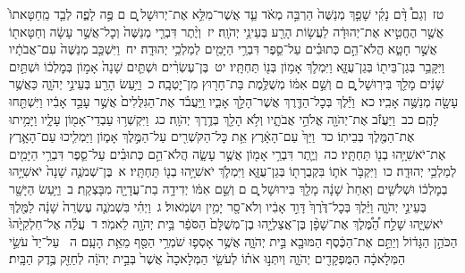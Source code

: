 \documentclass[18pt]{article}
\newcommand{\kri}[1]{\Afootnote{#1}}	%
\begin{document}
 {\loc טז~}וְגַם֩ דָּ֨ם נָקִ֜י שָׁפַ֤ךְ מְנַשֶּׁה֙ הַרְבֵּ֣ה מְאֹ֔ד עַ֛ד אֲשֶׁר־מִלֵּ֥א אֶת־יְרוּשָׁל ַ֖͏ְם ם פֶּ֣ה לָפֶ֑ה לְבַ֤ד מֵֽחַטָּאתוֹ֙ אֲשֶׁ֣ר הֶחֱטִ֣יא אֶת־יְהוּדָ֔ה לַעֲשׂ֥וֹת הָרַ֖ע בְּעֵינֵ֥י יְהֹוָֽה׃ \startlock
 {\loc יז~}וְיֶ֨תֶר דִּבְרֵ֤י מְנַשֶּׁה֙ וְכׇל־אֲשֶׁ֣ר עָשָׂ֔ה וְחַטָּאת֖וֹ אֲשֶׁ֣ר חָטָ֑א הֲלֹא־הֵ֣ם כְּתוּבִ֗ים עַל־סֵ֛פֶר דִּבְרֵ֥י הַיָּמִ֖ים לְמַלְכֵ֥י יְהוּדָֽה׃ \startlock
 {\loc יח~}וַיִּשְׁכַּ֤ב מְנַשֶּׁה֙ עִם־אֲבֹתָ֔יו וַיִּקָּבֵ֥ר בְּגַן־בֵּית֖וֹ בְּגַן־עֻזָּ֑א וַיִּמְלֹ֛ךְ אָמ֥וֹן בְּנ֖וֹ תַּחְתָּֽיו׃ \startlock
 {\loc יט~}בֶּן־עֶשְׂרִ֨ים וּשְׁתַּ֤יִם שָׁנָה֙ אָמ֣וֹן בְּמׇלְכ֔וֹ וּשְׁתַּ֣יִם שָׁנִ֔ים מָלַ֖ךְ בִּירֽוּשָׁל ָ֑͏ְם ם וְשֵׁ֣ם אִמּ֔וֹ מְשֻׁלֶּ֥מֶת בַּת־חָר֖וּץ מִן־יׇטְבָֽה׃ \startlock
 {\loc כ~}וַיַּ֥עַשׂ הָרַ֖ע בְּעֵינֵ֣י יְהֹוָ֑ה כַּאֲשֶׁ֥ר עָשָׂ֖ה מְנַשֶּׁ֥ה אָבִֽיו׃ \startlock
 {\loc כא~}וַיֵּ֕לֶךְ בְּכׇל־הַדֶּ֖רֶךְ אֲשֶׁר־הָלַ֣ךְ אָבִ֑יו וַֽיַּעֲבֹ֗ד אֶת־הַגִּלֻּלִים֙ אֲשֶׁ֣ר עָבַ֣ד אָבִ֔יו וַיִּשְׁתַּ֖חוּ לָהֶֽם׃ \startlock
 {\loc כב~}וַיַּעֲזֹ֕ב אֶת־יְהֹוָ֖ה אֱלֹהֵ֣י אֲבֹתָ֑יו וְלֹ֥א הָלַ֖ךְ בְּדֶ֥רֶךְ יְהֹוָֽה׃ \startlock
 {\loc כג~}וַיִּקְשְׁר֥וּ עַבְדֵי־אָמ֖וֹן עָלָ֑יו וַיָּמִ֥יתוּ אֶת־הַמֶּ֖לֶךְ בְּבֵיתֽוֹ׃ \startlock
 {\loc כד~}וַיַּךְ֙ עַם־הָאָ֔רֶץ אֵ֥ת כׇּל־הַקֹּשְׁרִ֖ים עַל־הַמֶּ֣לֶךְ אָמ֑וֹן וַיַּמְלִ֧יכוּ עַם־הָאָ֛רֶץ אֶת־יֹאשִׁיָּ֥הוּ בְנ֖וֹ תַּחְתָּֽיו׃ \startlock
 {\loc כה~}וְיֶ֛תֶר דִּבְרֵ֥י אָמ֖וֹן אֲשֶׁ֣ר עָשָׂ֑ה הֲלֹא־הֵ֣ם כְּתוּבִ֗ים עַל־סֵ֛פֶר דִּבְרֵ֥י הַיָּמִ֖ים לְמַלְכֵ֥י יְהוּדָֽה׃ \startlock
 {\loc כו~}וַיִּקְבֹּ֥ר אֹת֛וֹ בִּקְבֻרָת֖וֹ בְּגַן־עֻזָּ֑א וַיִּמְלֹ֛ךְ יֹאשִׁיָּ֥הוּ בְנ֖וֹ תַּחְתָּֽיו׃ 
\startlock
 {\loc א~}בֶּן־שְׁמֹנֶ֤ה שָׁנָה֙ יֹאשִׁיָּ֣הוּ בְמׇלְכ֔וֹ וּשְׁלֹשִׁ֤ים וְאַחַת֙ שָׁנָ֔ה מָלַ֖ךְ בִּירוּשָׁל ָ֑͏ְם ם וְשֵׁ֣ם אִמּ֔וֹ יְדִידָ֥ה בַת־עֲדָיָ֖ה מִבָּצְקַֽת׃ \startlock
 {\loc ב~}וַיַּ֥עַשׂ הַיָּשָׁ֖ר בְּעֵינֵ֣י יְהֹוָ֑ה וַיֵּ֗לֶךְ בְּכׇל־דֶּ֙רֶךְ֙ דָּוִ֣ד אָבִ֔יו וְלֹא־סָ֖ר יָמִ֥ין וּשְׂמֹֽאול׃ \startlock
 {\loc ג~}וַיְהִ֗י בִּשְׁמֹנֶ֤ה עֶשְׂרֵה֙ שָׁנָ֔ה לַמֶּ֖לֶךְ יֹאשִׁיָּ֑הוּ שָׁלַ֣ח הַ֠מֶּ֠לֶךְ אֶת־שָׁפָ֨ן בֶּן־אֲצַלְיָ֤הוּ בֶן־מְשֻׁלָּם֙ הַסֹּפֵ֔ר בֵּ֥ית יְהֹוָ֖ה לֵאמֹֽר׃ \startlock
 {\loc ד~}עֲלֵ֗ה אֶל־חִלְקִיָּ֙הוּ֙ הַכֹּהֵ֣ן הַגָּד֔וֹל וְיַתֵּ֣ם אֶת־הַכֶּ֔סֶף הַמּוּבָ֖א בֵּ֣ית יְהֹוָ֑ה אֲשֶׁ֥ר אָסְפ֛וּ שֹׁמְרֵ֥י הַסַּ֖ף מֵאֵ֥ת הָעָֽם׃ \startlock
 {\loc ה~}\edtext{(ויתנה)}{\kri{קרי: וְיִתְּנוּ֗הוּ}}  עַל־יַד֙ עֹשֵׂ֣י הַמְּלָאכָ֔ה הַמֻּפְקָדִ֖ים  \edtext{(בבית)}{\kri{קרי: בֵּ֣ית}}  יְהֹוָ֑ה וְיִתְּנ֣וּ אֹת֗וֹ לְעֹשֵׂ֤י הַמְּלָאכָה֙ אֲשֶׁר֙ בְּבֵ֣ית יְהֹוָ֔ה לְחַזֵּ֖ק בֶּ֥דֶק הַבָּֽיִת׃ \startlock
\end{document}
